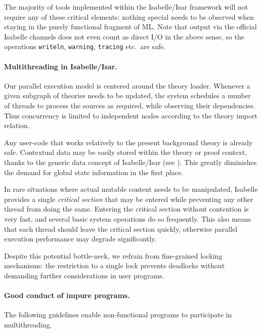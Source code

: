 \begin{isabellebody}
\begin{isamarkuptext}
\begin{itemize}
  \end{itemize}

  The majority of tools implemented within the Isabelle/Isar framework
  will not require any of these critical elements: nothing special
  needs to be observed when staying in the purely functional fragment
  of ML.  Note that output via the official Isabelle channels does not
  even count as direct I/O in the above sense, so the operations \verb|writeln|, \verb|warning|, \verb|tracing| etc.\ are safe.

  \paragraph{Multithreading in Isabelle/Isar.}  Our parallel execution
  model is centered around the theory loader.  Whenever a given
  subgraph of theories needs to be updated, the system schedules a
  number of threads to process the sources as required, while
  observing their dependencies.  Thus concurrency is limited to
  independent nodes according to the theory import relation.

  Any user-code that works relatively to the present background theory
  is already safe.  Contextual data may be easily stored within the
  theory or proof context, thanks to the generic data concept of
  Isabelle/Isar (see ).  This greatly
  diminishes the demand for global state information in the first
  place.

  \medskip In rare situations where actual mutable content needs to be
  manipulated, Isabelle provides a single \emph{critical section} that
  may be entered while preventing any other thread from doing the
  same.  Entering the critical section without contention is very
  fast, and several basic system operations do so frequently.  This
  also means that each thread should leave the critical section
  quickly, otherwise parallel execution performance may degrade
  significantly.

  Despite this potential bottle-neck, we refrain from fine-grained
  locking mechanisms: the restriction to a single lock prevents
  deadlocks without demanding further considerations in user programs.

  \paragraph{Good conduct of impure programs.} The following
  guidelines enable non-functional programs to participate in
  multithreading.


\end{isamarkuptext}
\end{isabellebody}
